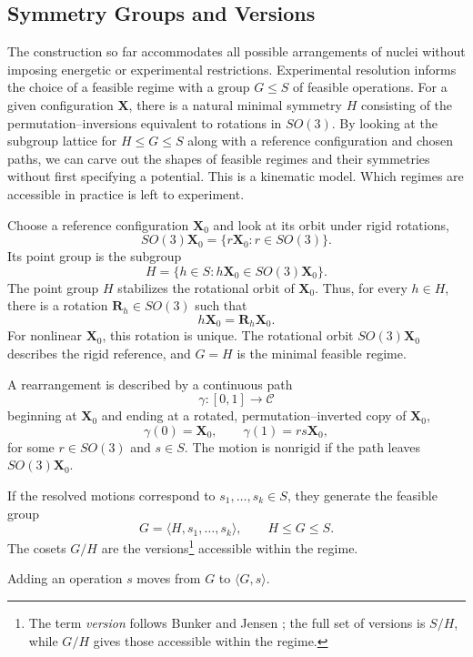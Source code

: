 \documentclass[12pt]{article}
\newcommand{\conf}{\mathcal{C}}
\newcommand{\X}{\mathbf{X}}                 %
\newcommand{\Rmat}{\mathbf{R}}              %
\begin{document}
\subsection{Symmetry Groups and Versions}
\label{sec:feasible-regimes}

The construction so far accommodates all possible
arrangements of nuclei without imposing energetic or
experimental restrictions. Experimental resolution informs the choice of a feasible
regime with a group $G\leq S$ of feasible operations. For a given configuration $\X$,
there is a natural minimal symmetry $H$ consisting of the
permutation--inversions equivalent to rotations in $SO(3)$. By looking at the subgroup lattice for $H\leq G\leq S$
along with a reference configuration and chosen paths,
we can carve out the shapes of feasible regimes and
their symmetries without first specifying a potential.
This is a kinematic model. Which
regimes are accessible in practice is left to experiment.

Choose a reference configuration $\X_0$ and look at its orbit
under rigid rotations,
\[
SO(3)\X_0=\{r\X_0:r\in SO(3)\}.
\]
Its point group is the subgroup
\[
H
=
\{h\in S:h\X_0\in SO(3)\X_0\}.
\]
The point group $H$ stabilizes the rotational orbit of $\X_0$.
Thus, for every $h\in H$, there is a rotation $\Rmat_h\in SO(3)$
such that
\[
h\X_0=\Rmat_h\X_0.
\]
For nonlinear $\X_0$, this rotation is unique. The rotational
orbit $SO(3)\X_0$ describes the rigid reference, and $G=H$ is
the minimal feasible regime.

A rearrangement is described by a continuous path
\[
\gamma:[0,1]\to\conf
\]
beginning at $\X_0$ and ending at a rotated,
permutation--inverted copy of $\X_0$,
\[
\gamma(0)=\X_0,
\qquad
\gamma(1)=rs\X_0,
\]
for some $r\in SO(3)$ and $s\in S$. The motion is
nonrigid if the path leaves $SO(3)\X_0$.

If the resolved motions correspond to
$s_1,\ldots,s_k\in S$, they generate the feasible group
\[
G=\langle H,s_1,\ldots,s_k\rangle,
\qquad
H\leq G\leq S.
\]
The cosets $G/H$ are the versions\footnote{The term
\emph{version} follows Bunker and Jensen
\cite{BunkerJensen1998}; the full set of versions is $S/H$,
while $G/H$ gives those accessible within the regime.}
accessible within the regime.

Adding an operation $s$ moves from $G$ to $\langle G,s\rangle$.
\end{document}
